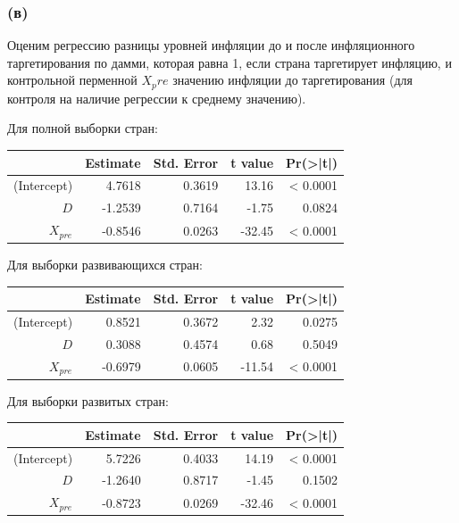 \documentclass[a4paper,12pt]{article} %
\begin{document}
\subsubsection*{(в)}	

Оценим регрессию разницы уровней инфляции до и после инфляционного таргетирования по дамми, которая равна 1, если страна таргетирует инфляцию, и контрольной перменной  $ X_pre $ значению инфляции до таргетирования (для контроля на наличие регрессии к среднему значению).
 
Для полной выборки стран:
 
\begin{table}[h!]
	\centering
	\begin{tabular}{rrrrr}
		\hline
		& Estimate & Std. Error & t value & Pr(>|t|) \\ 
		\hline
		(Intercept) & 4.7618 & 0.3619 & 13.16 & < 0.0001 \\ 
		$ D $ & -1.2539 & 0.7164 & -1.75 & 0.0824 \\ 
		$ X_{pre} $ & -0.8546 & 0.0263 & -32.45 & < 0.0001 \\ 
		\hline
	\end{tabular}
\end{table}

Для выборки развивающихся стран:

\begin{table}[h!]
	\centering
	\begin{tabular}{rrrrr}
		\hline
		& Estimate & Std. Error & t value & Pr(>|t|) \\ 
		\hline
		(Intercept) & 0.8521 & 0.3672 & 2.32 & 0.0275 \\ 
		$ D $ & 0.3088 & 0.4574 & 0.68 & 0.5049 \\ 
		$ X_{pre} $ & -0.6979 & 0.0605 & -11.54 & < 0.0001 \\ 
		\hline
	\end{tabular}
\end{table}

\newpage

Для выборки развитых стран:

\begin{table}[h!]
	\centering
	\begin{tabular}{rrrrr}
		\hline
		& Estimate & Std. Error & t value & Pr(>|t|) \\ 
		\hline
		(Intercept) & 5.7226 & 0.4033 & 14.19 & < 0.0001 \\ 
		$ D $ & -1.2640 & 0.8717 & -1.45 & 0.1502 \\ 
		$ X_{pre} $  & -0.8723 & 0.0269 & -32.46 & < 0.0001 \\ 
		\hline
	\end{tabular}
\end{table}
\end{document}
